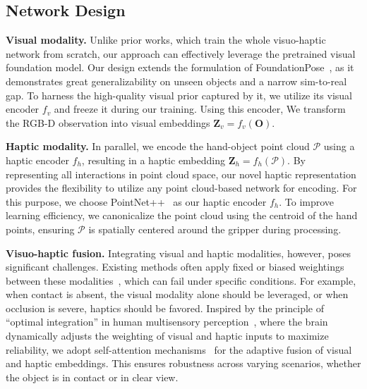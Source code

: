 \documentclass[11pt, a4paper, logo, twocolumn]{brown}
\begin{document}
\subsection{Network Design}
\textbf{Visual modality.}
Unlike prior works, which train the whole visuo-haptic network from scratch, our approach can effectively leverage the pretrained visual foundation model.
Our design extends the formulation of FoundationPose~\cite{wen_foundationpose_2024}, as it demonstrates great generalizability on unseen objects and a narrow sim-to-real gap.
To harness the high-quality visual prior captured by it, we utilize its visual encoder $f_v$ and freeze it during our training.
Using this encoder, We transform the RGB-D observation into visual embeddings $\mathbf{Z}_v = f_v(\mathbf{O})$.

\textbf{Haptic modality.}
In parallel, we encode the hand-object point cloud $\mathcal{P}$ using a haptic encoder $f_h$, resulting in a haptic embedding ${\mathbf{Z}_h = f_h(\mathcal{P})}$.
By representing all interactions in point cloud space, our novel haptic representation provides the flexibility to utilize any point cloud-based network for encoding.
For this purpose, we choose PointNet++~\cite{qi_pointnet++_2017} as our haptic encoder $f_h$.
To improve learning efficiency, we canonicalize the point cloud using the centroid of the hand points, ensuring $\mathcal{P}$ is spatially centered around the gripper during processing.

\textbf{Visuo-haptic fusion.}
Integrating visual and haptic modalities, however, poses significant challenges. 
Existing methods often apply fixed or biased weightings between these modalities~\cite{li_vihope_2023, suresh_neuralfeels_2024, dikhale_visuotactile_2022, tu_posefusion_2023}, which can fail under specific conditions. For example, when contact is absent, the visual modality alone should be leveraged, or when occlusion is severe, haptics should be favored.
Inspired by the principle of ``optimal integration'' in human multisensory perception~\cite{ernst_humans_2002, helbig_optimal_2007, lacey_chapter_2020, takahashi_visual-haptic_2014, helbig_neural_2012}, where the brain dynamically adjusts the weighting of visual and haptic inputs to maximize reliability, we adopt self-attention mechanisms~\cite{vaswani_attention_2017} for the adaptive fusion of visual and haptic embeddings. 
This ensures robustness across varying scenarios, whether the object is in contact or in clear view.
\end{document}
